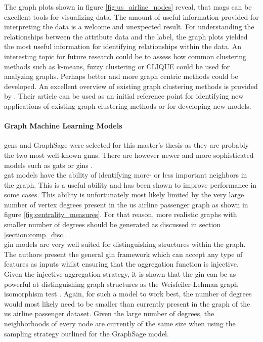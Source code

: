   \noindent The graph plots shown in figure \ref{fig:us_airline_nodes} reveal,
  that \acsp{mag} can be excellent tools for visualizing data. The
  amount of useful information provided for interpreting the data is a welcome
  and unexpected result. For understanding the relationships between the
  attribute data and the label, the graph plots yielded the most useful
  information for identifying relationships within the data. An interesting
  topic for future research could be to assess how common clustering methods
  such as k-means, fuzzy clustering or CLIQUE could be used for analyzing
  graphs. Perhaps better and more graph centric methods could be developed. An
  excellent overview of existing graph clustering methods is provided by
  \cite{zhou2020graph}. Their article can be used as an initial reference point
  for identifying new applications of existing graph clustering methods or for 
  developing new models.

  \paragraph{Graph Machine Learning Models}\mbox{}

  \noindent \acsp{gcn} and GraphSage were selected for this master's thesis as 
  they are probably the two most well-known \acsp{gnn}. There are however 
  newer and more sophisticated models such as \acp{gat} \citep{velivckovic2018graph} 
  or \acp{gin} \citep{xu2019powerful}. \\

  \noindent \acs{gat} models have the ability of identifying more- or less 
  important neighbors in the graph. This is a useful ability and has been shown 
  to improve performance in some cases. This ability is unfortunately most likely 
  limited by the very large number of vertex degrees present in the \acs{us} 
  airline passenger graph as shown in figure \ref{fig:centrality_measures}. For 
  that reason, more realistic graphs with smaller number of degrees should be
  generated as discussed in section \ref{section:comp_disc}. \\

  \noindent \acs{gin} models are very well suited for distinguishing structures 
  within the graph. The authors \cite{xu2019powerful} present the general
  \acs{gin} framework which can accept any type of features as inputs whilst 
  ensuring that the aggregation function is injective. Given the injective 
  aggregation strategy, it is shown that the \acs{gin} can be as powerful at 
  distinguishing graph structures as the Weisfeiler-Lehman graph isomorphism test 
  \citep{weisfeiler1968}. Again, for such a model to work best, the number of
  degrees would most likely need to be smaller than currently present in the
  graph of the \acs{us} airline passenger dataset. Given the large number of 
  degrees, the neighborhoods of every node are currently of the same size when 
  using the sampling strategy outlined for the GraphSage model. \\

